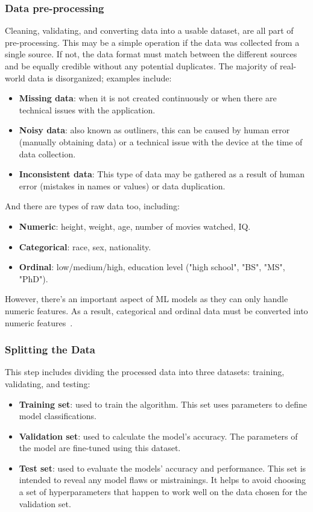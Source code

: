 \subsubsection{Data pre-processing}

Cleaning, validating, and converting data into a usable dataset, are all part of pre-processing. This may be a simple operation if the data was collected from a single source. If not, the data format must match between the different sources and be equally credible without any potential duplicates. The majority of real-world data is disorganized; examples include:
\begin{itemize}
    \item \textbf{Missing data}: when it is not created continuously or when there are technical issues with the application.
    \item \textbf{Noisy data}: also known as outliners, this can be caused by human error (manually obtaining data) or a technical issue with the device at the time of data collection.
    \item \textbf{Inconsistent data}: This type of data may be gathered as a result of human error (mistakes in names or values) or data duplication.
\end{itemize}

And there are types of raw data too, including:

\begin{itemize}
    \item \textbf{Numeric}: height, weight, age, number of movies watched, IQ.
    \item \textbf{Categorical}: race, sex, nationality.
    \item \textbf{Ordinal}: low/medium/high, education level ("high school", "BS", "MS", "PhD").
\end{itemize}

However, there's an important aspect of \gls{ML} models as they can only handle numeric features. As a result, categorical and ordinal data must be converted into numeric features~\cite{Pant2019WorkflowProject}.


\subsubsection{Splitting the Data}

This step includes dividing the processed data into three datasets: training, validating, and testing:

\begin{itemize}
    \item \textbf{Training set}: used to train the algorithm. This set uses parameters to define model classifications.
    \item \textbf{Validation set}: used to calculate the model's accuracy. The parameters of the model are fine-tuned using this dataset.
    \item \textbf{Test set}: used to evaluate the models' accuracy and performance. This set is intended to reveal any model flaws or mistrainings. It helps to avoid choosing a set of hyperparameters that happen to work well on the data chosen for the validation set.
\end{itemize}

